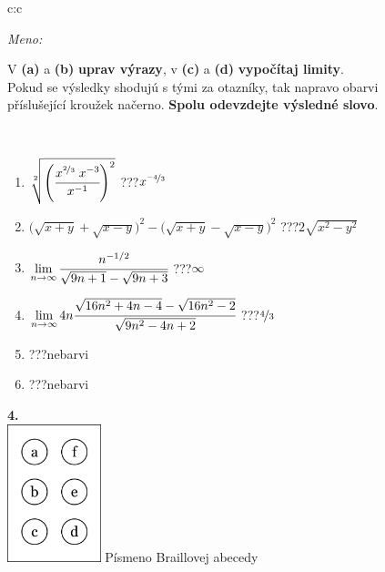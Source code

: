 \documentclass[10pt]{report}
\begin{document}
\begin{tabular}{c:c}
\begin{minipage}[c][104.5mm][t]{0.5\linewidth}
\begin{center}
\textit{Meno:}\phantom{xxxxxxxxxxxxxxxxxxxxxxxxxxxxxxxxxxxxxxxxxxxxxxxxxxxxxxxxxxxxxxxxx}\\[5mm]
\begin{minipage}{0.95\linewidth}
\begin{center}
V \textbf{(a)} a \textbf{(b)} \textbf{uprav výrazy}, v \textbf{(c)} a \textbf{(d)} \textbf{vypočítaj limity}.\\Pokud se výsledky shodujú s tými za otazníky, tak napravo obarvi\\příslušející kroužek načerno. \textbf{Spolu odevzdejte výsledné slovo}.
\end{center}
\end{minipage}
\\[1mm]
\begin{minipage}{0.79\linewidth}
\begin{center}
\begin{varwidth}{\linewidth}
\begin{enumerate}
\small
\item $\sqrt[2]{\left(\cfrac{x^{\nicefrac{2}{3}}\;x^{-3}}{x^{-1}}\right)^{2}}$\quad \dotfill\; ???\;\dotfill \quad $x^{\nicefrac{-4}{3}}$
\item {\footnotesize{\scriptsize$\big(\sqrt{x+y}+\sqrt{x-y}\big)^2-\big(\sqrt{x+y}-\sqrt{x-y}\big)^2$}\quad \dotfill\; ???\;\dotfill \quad $2\sqrt{x^2-y^2}$}
\item $\lim\limits_{n\to\infty}\cfrac{n^{-1/2}}{\sqrt{9n+1}-\sqrt{9n+3}}$\quad \dotfill\; ???\;\dotfill \quad $\infty$
\item $\lim\limits_{n\to\infty}4n\cfrac{\sqrt{16n^2+4n-4}-\sqrt{16n^2-2}}{\sqrt{9n^2-4n+2}}$\quad \dotfill\; ???\;\dotfill \quad $\nicefrac{4}{3}$
\item \quad \dotfill\; ???\;\dotfill \quad nebarvi
\item \quad \dotfill\; ???\;\dotfill \quad nebarvi
\end{enumerate}
\end{varwidth}
\end{center}
\end{minipage}
\begin{minipage}{0.20\linewidth}
\begin{center}
{\Huge\bfseries 4.} \\[2mm]
\includegraphics[height=40mm]{../images/braille.png}
{\small Písmeno Braillovej abecedy}
\end{center}
\end{minipage}
\end{center}
\end{minipage}
%
\end{tabular}
\end{document}

